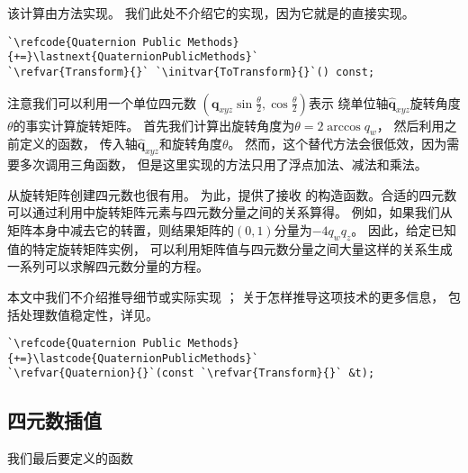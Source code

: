 该计算由方法实现。
我们此处不介绍它的实现，因为它就是的直接实现。
\begin{lstlisting}
`\refcode{Quaternion Public Methods}{+=}\lastnext{QuaternionPublicMethods}`
`\refvar{Transform}{}` `\initvar{ToTransform}{}`() const;
\end{lstlisting}

注意我们可以利用一个单位四元数
$\displaystyle(\bm q_{xyz}\sin\frac{\theta}{2},\cos\frac{\theta}{2})$表示
绕单位轴$\hat{\bm q}_{xyz}$旋转角度$\theta$的事实计算旋转矩阵。
首先我们计算出旋转角度为$\theta=2\arccos q_w$，
然后利用之前定义的函数，
传入轴$\hat{\bm q}_{xyz}$和旋转角度$\theta$。
然而，这个替代方法会很低效，因为需要多次调用三角函数，
但是这里实现的方法只用了浮点加法、减法和乘法。

从旋转矩阵创建四元数也很有用。
为此，提供了接收
的构造函数。合适的四元数可以通过利用中旋转矩阵元素与四元数分量之间的关系算得。
例如，如果我们从矩阵本身中减去它的转置，则结果矩阵的$(0,1)$分量为$-4q_wq_z$。
因此，给定已知值的特定旋转矩阵实例，
可以利用矩阵值与四元数分量之间大量这样的关系生成一系列可以求解四元数分量的方程。

本文中我们不介绍推导细节或实际实现
；
关于怎样推导这项技术的更多信息，
包括处理数值稳定性，详见\citet{SHOEMAKE1991351}。

\begin{lstlisting}
`\refcode{Quaternion Public Methods}{+=}\lastcode{QuaternionPublicMethods}`
`\refvar{Quaternion}{}`(const `\refvar{Transform}{}` &t);
\end{lstlisting}

\subsection{四元数插值}\label{sub:四元数插值}
我们最后要定义的函数